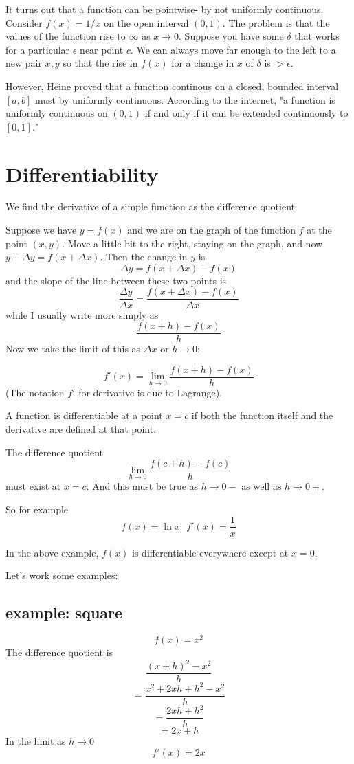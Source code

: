 \documentclass[11pt, oneside]{article}   	%
\begin{document}
It turns out that a function can be pointwise- by not uniformly continuous.  Consider $f(x) = 1/x$ on the open interval $(0,1)$.  The problem is that the values of the function rise to $\infty$ as $x \rightarrow 0$.  Suppose you have some $\delta$ that works for a particular $\epsilon$ near point $c$.  We can always move far enough to the left to a new pair $x,y$ so that the rise in $f(x)$ for a change in $x$ of $\delta$ is $> \epsilon$.

However, Heine proved that a function continous on a closed, bounded interval $[a,b]$ must by uniformly continuous.  According to the internet, 
"a function is uniformly continuous on $(0,1)$ if and only if it can be extended continuously to $[0,1]$."

\section*{Differentiability}
We find the derivative of a simple function as the difference quotient.  

Suppose we have $y=f(x)$ and we are on the graph of the function $f$ at the point $(x,y)$.  Move a little bit to the right, staying on the graph, and now $y + \Delta y = f(x + \Delta x)$.  Then the change in $y$ is
\[ \Delta y = f(x + \Delta x) - f(x) \]
and the slope of the line between these two points is
\[ \frac{\Delta y}{\Delta x} = \frac{f(x + \Delta x) - f(x)}{\Delta x} \]
while I usually write more simply as
\[  \frac{f(x+h) - f(x)}{h} \]
Now we take the limit of this as $\Delta x$ or $h \rightarrow 0$:

\[ f'(x) = \lim_{h \to 0} \frac{f(x+h) - f(x)}{h} \]
(The notation $f'$ for derivative is due to Lagrange).

A function is differentiable at a point $x=c$ if both the function itself and the derivative are defined at that point.  

The difference quotient
\[ \lim_{h \to 0} \frac{f(c+h) - f(c)}{h} \]
must exist at $x=c$.  And this must be true as  $h \to 0-$ as well as $h \to 0+$.

So for example
\[ f(x) = \ln x  \ \ \  f'(x) = \frac{1}{x} \]

In the above example, $f(x)$ is differentiable everywhere except at $x=0$.

Let's work some examples:
\subsection*{example:  square}
\[ f(x) = x^2 \]
The difference quotient is
\[ \frac{(x+h)^2 - x^2}{h} \]
\[ = \frac{x^2 + 2xh + h^2 - x^2}{h} \]
\[ = \frac{2xh + h^2}{h} \]
\[ = 2x + h \]
In the limit as $h \rightarrow 0$
\[ f'(x) = 2x \]
\end{document}
